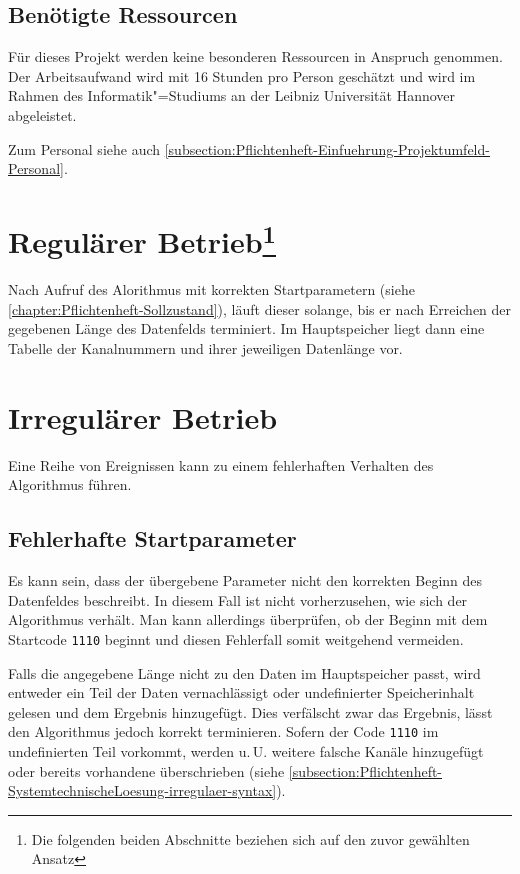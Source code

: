 \subsection{Benötigte Ressourcen}
Für dieses Projekt werden keine besonderen Ressourcen in Anspruch genommen. Der Arbeitsaufwand wird mit 16 Stunden pro Person geschätzt und wird im Rahmen des Informatik"=Studiums an der Leibniz Universität Hannover abgeleistet.

Zum Personal siehe auch \autoref{subsection:Pflichtenheft-Einfuehrung-Projektumfeld-Personal}.


\section[Regulärer Betrieb]{Regulärer Betrieb\footnote{Die folgenden beiden Abschnitte beziehen sich auf den zuvor gewählten Ansatz}}
\label{section:Pflichtenheft-SystemtechnischeLoesung-regulaer}

Nach Aufruf des Alorithmus mit korrekten Startparametern (siehe \autoref{chapter:Pflichtenheft-Sollzustand}), läuft dieser solange, bis er nach Erreichen der gegebenen Länge des Datenfelds terminiert. Im Hauptspeicher liegt dann eine Tabelle der Kanalnummern und ihrer jeweiligen Datenlänge vor.


\section{Irregulärer Betrieb}
\label{section:Pflichtenheft-SystemtechnischeLoesung-irregulaer}

Eine Reihe von Ereignissen kann zu einem fehlerhaften Verhalten des Algorithmus führen.

\subsection{Fehlerhafte Startparameter}
\label{subsection:Pflichtenheft-SystemtechnischeLoesung-irregulaer-startparameter}

Es kann sein, dass der übergebene Parameter nicht den korrekten Beginn des Datenfeldes beschreibt. In diesem Fall ist nicht vorherzusehen, wie sich der Algorithmus verhält. Man kann allerdings überprüfen, ob der Beginn mit dem Startcode \texttt{1110} beginnt und diesen Fehlerfall somit weitgehend vermeiden.

Falls die angegebene Länge nicht zu den Daten im Hauptspeicher passt, wird entweder ein Teil der Daten vernachlässigt oder undefinierter Speicherinhalt gelesen und dem Ergebnis hinzugefügt. Dies verfälscht zwar das Ergebnis, lässt den Algorithmus jedoch korrekt terminieren. Sofern der Code \texttt{1110} im undefinierten Teil vorkommt, werden u.\,U. weitere falsche Kanäle hinzugefügt oder bereits vorhandene überschrieben (siehe \autoref{subsection:Pflichtenheft-SystemtechnischeLoesung-irregulaer-syntax}).

